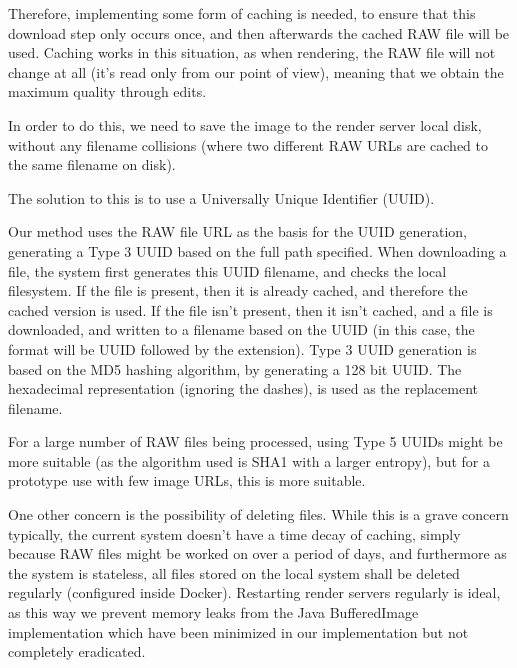 \documentclass[11pt,a4paper]{article}
\begin{document}
Therefore, implementing some form of caching is needed, to ensure that this download step only occurs once,
and then afterwards the cached RAW file will be used. Caching works in this situation, as when rendering,
the RAW file will not change at all (it's read only from our point of view), meaning that we obtain the
maximum quality through edits.

In order to do this, we need to save the image to the render server local disk, without any filename collisions
(where two different RAW URLs are cached to the same filename on disk).

The solution to this is to use a Universally Unique Identifier (UUID).

Our method uses the RAW file URL as the basis for the UUID generation, generating a Type 3 UUID based on the full path specified.
When downloading a file, the system first generates this UUID filename, and checks the local filesystem. If the file is present, then it
is already cached, and therefore the cached version is used. If the file isn't present, then it isn't cached, and a file is downloaded, and 
written to a filename based on the UUID (in this case, the format will be UUID followed by the extension). Type 3 UUID generation is based on
the MD5 hashing algorithm, by generating a 128 bit UUID. The hexadecimal representation (ignoring the dashes), is used as the replacement filename.


For a large number of RAW files being processed, using Type 5 UUIDs might be more suitable (as the algorithm used is SHA1 with a larger entropy), but
for a prototype use with few image URLs, this is more suitable.

One other concern is the possibility of deleting files. While this is a grave concern typically, the current system doesn't have a time decay of caching,
simply because RAW files might be worked on over a period of days, and furthermore as the system is stateless, all files stored on the local system shall be
deleted regularly (configured inside Docker). Restarting render servers regularly is ideal, as this way we prevent memory leaks from the Java BufferedImage implementation
which have been minimized in our implementation but not completely eradicated.
\end{document}
